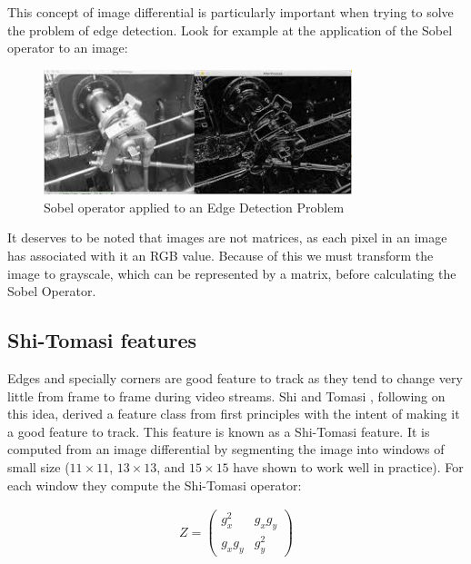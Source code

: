 \documentclass{article}
\begin{document}
This concept of image differential is particularly important when trying to solve the problem of edge detection. Look for example at the application of the Sobel operator to an image: \\

\begin{figure}[H]
\begin{center}
\includegraphics[width=0.8\textwidth]{sobel}
\caption{Sobel operator applied to an Edge Detection Problem}
\end{center}
\end{figure}

It deserves to be noted that images are not matrices, as each pixel in an image has associated with it an RGB value. Because of this we must transform the image to grayscale, which can be represented by a matrix, before calculating the Sobel Operator. \\

\subsection{Shi-Tomasi features}

Edges and specially corners are good feature to track as they tend to change very little from frame to frame during video streams. Shi and Tomasi \cite{JianboShi1994}, following on this idea, derived a feature class from first principles with the intent of making it a good feature to track. This feature is known as a Shi-Tomasi feature. It is computed from an image differential by segmenting the image into windows of small size ($11 \times 11$, $13 \times 13$, and $15 \times 15$ have shown to work well in practice). For each window they compute the Shi-Tomasi operator:

\begin{gather*}
Z
=
\begin{pmatrix}
g_x^2 & g_x g_y \\
g_x g_y & g_y^2
\end{pmatrix} \\
\end{gather*}
\end{document}
